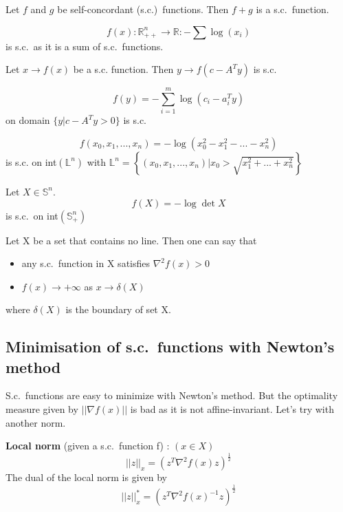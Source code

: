 \begin{property}
Let $f$ and $g$ be self-concordant (s.c.)\ functions. Then $f+g$ is a s.c.\ function.
\end{property}

\begin{example}
\begin{leftbar}
$$f(x) : \mathbb{R}_{++}^n \rightarrow \mathbb{R} : -\sum \log{(x_i)}$$ is s.c.\ as it is a sum of s.c.\ functions.
\end{leftbar}
\end{example}

\begin{property}
Let $x \rightarrow f(x)$ be a s.c. function. Then $y \rightarrow f(c-A^Ty)$ is s.c.\
\end{property}

\begin{example}
\begin{leftbar}
$$f(y) = - \sum\limits_{i=1}^m \log{(c_i-a_i^Ty)}$$ on domain $\{y|c-A^Ty > 0\}$ is s.c.\
\end{leftbar}
\end{example}

\begin{example}
\begin{leftbar}
$$f(x_0,x_1,...,x_n) = -\log{(x_0^2-x_1^2-...-x_n^2)}$$ is s.c. on int$(\mathbb{L}^n)$ with $\mathbb{L}^n = \left\{(x_0,x_1,...,x_n) | x_0 > \sqrt{x_1^2+...+x_n^2}\right\}$
\end{leftbar}
\end{example}

\begin{example}
\begin{leftbar}
Let $X \in \mathbb{S}^n$.
$$f(X) = -\log{\det{X}}$$
is s.c.\ on int$(\mathbb{S}_+^n)$
\end{leftbar}
\end{example}

\begin{property}
Let X be a set that contains no line. Then one can say that
\begin{itemize}
\item any s.c.\ function in X satisfies $\nabla^2 f(x) > 0$
\item $f(x) \rightarrow + \infty$ as $x \rightarrow \delta(X)$
\end{itemize}
where $\delta(X)$ is the boundary of set X.
\end{property}

\subsection{Minimisation of s.c.\ functions with Newton's method}
S.c.\ functions are easy to minimize with Newton's method. But the optimality measure given by $|| \nabla f(x) ||$ is bad as it is not affine-invariant. Let's try with another norm.
\begin{definition} \textbf{Local norm} (given a s.c.\ function f) : $(x \in X)$ 
$$
||z||_x  = (z^T \nabla^2f(x)z)^{\frac{1}{2}}
$$
The dual of the local norm is given by
$$
||z||^*_x  = (z^T \nabla^2f(x)^{-1}z)^{\frac{1}{2}}
$$
\end{definition}

